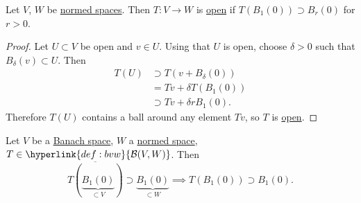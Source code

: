 \documentclass{article}
\begin{document}
\begin{lemma}
    Let $V$, $W$ be \hyperlink{def:nvs}{normed spaces}. Then $T: V \to W$ is \hyperlink{def:openMap}{open} if $T(B_1(0)) \supset B_r(0)$ for $r > 0$.
\end{lemma}

\begin{proof}
    Let $U \subset V$ be open and $v \in U$. Using that $U$ is open, choose $\delta > 0$ such that $B_\delta(v) \subset U$. Then
    \begin{align*}
        T(U) &\supset T(v + B_\delta(0)) \\
             &=Tv + \delta T(B_1(0)) \\
             &\supset T v + \delta r B_1(0).
    \end{align*}
    Therefore $T(U)$ contains a ball around any element $Tv$, so $T$ is \hyperlink{def:openMap}{open}.
\end{proof}

\begin{lemma}
    Let $V$ be a \hyperlink{def:banach}{Banach space}, $W$ a \hyperlink{def:nvs}{normed space}, $T \in \hyperlink{def:bvw}{\mathcal{B}(V, W)}$. Then
    \begin{equation*}
        \overline{T(\underbrace{B_1(0)}_{\subset V})} \supset \underbrace{B_1(0)}_{\subset W} \implies T(B_1(0)) \supset B_1(0).
    \end{equation*}
\end{lemma}
\end{document}
